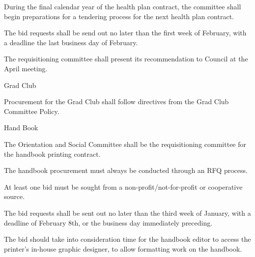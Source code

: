 \begin{longenum}[label*=\thesection.\arabic*., align=left]
\begin{longenum} [label*=\arabic*., align=left]
\begin{longenum} [label*=\arabic*., align=left]
		\item 	During the final calendar year of the health plan contract, the committee shall begin preparations for a tendering process for the next health plan contract.
			
		\item 	The bid requests shall be send out no later than the first week of February, with a deadline the last business day of February.
			
		\item 	The requisitioning committee shall present its recommendation to Council at the April meeting. 
			
	\end{longenum}	
\item Grad Club
\begin{longenum} [label*=\arabic*., align=left]
	\item Procurement for the Grad Club shall follow directives from the Grad Club Committee Policy.
\end{longenum}	
\item Hand Book
\begin{longenum} [label*=\arabic*., align=left]
	\item The Orientation and Social Committee shall be the requisitioning committee for the handbook printing contract.
	
	\item The handbook procurement must always be conducted through an RFQ process.
	
	\item At least one bid must be sought from a non-profit/not-for-profit or cooperative source.
	
	\item The bid requests shall be sent out no later than the third week of January, with a deadline of February 8th, or the business day immediately preceding.
	
	\item The bid should take into consideration time for the handbook editor to access the printer’s in-house graphic designer, to allow formatting work on the handbook.
\end{longenum}
\end{longenum}

\end{longenum}
